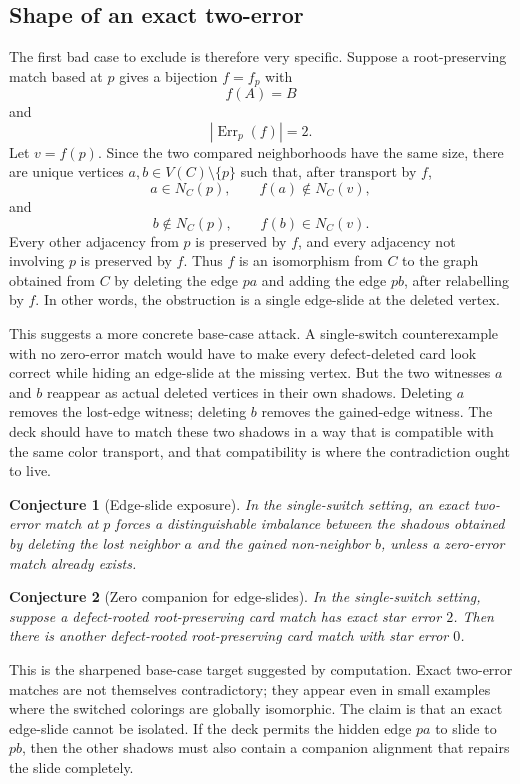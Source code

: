 \documentclass[11pt]{article}
\newtheorem{conjecture}{Conjecture}
\newcommand{\Err}{\operatorname{Err}}
\begin{document}
\subsection{Shape of an exact two-error}

The first bad case to exclude is therefore very specific.  Suppose a
root-preserving match based at \(p\) gives a bijection \(f=f_p\) with
\[
  f(A)=B
\]
and
\[
  |\Err_p(f)|=2.
\]
Let \(v=f(p)\).  Since the two compared neighborhoods have the same size,
there are unique vertices \(a,b\in V(C)\setminus\{p\}\) such that, after
transport by \(f\),
\[
  a\in N_C(p),
  \qquad
  f(a)\notin N_C(v),
\]
and
\[
  b\notin N_C(p),
  \qquad
  f(b)\in N_C(v).
\]
Every other adjacency from \(p\) is preserved by \(f\), and every adjacency
not involving \(p\) is preserved by \(f\).  Thus \(f\) is an isomorphism from
\(C\) to the graph obtained from \(C\) by deleting the edge \(pa\) and adding
the edge \(pb\), after relabelling by \(f\).  In other words, the obstruction
is a single edge-slide at the deleted vertex.

This suggests a more concrete base-case attack.  A single-switch
counterexample with no zero-error match would have to make every
defect-deleted card look correct while hiding an edge-slide at the missing
vertex.  But the two witnesses \(a\) and \(b\) reappear as actual deleted
vertices in their own shadows.  Deleting \(a\) removes the lost-edge witness;
deleting \(b\) removes the gained-edge witness.  The deck should have to
match these two shadows in a way that is compatible with the same color
transport, and that compatibility is where the contradiction ought to live.

\begin{conjecture}[Edge-slide exposure]
In the single-switch setting, an exact two-error match at \(p\) forces a
distinguishable imbalance between the shadows obtained by deleting the lost
neighbor \(a\) and the gained non-neighbor \(b\), unless a zero-error match
already exists.
\end{conjecture}

\begin{conjecture}[Zero companion for edge-slides]
In the single-switch setting, suppose a defect-rooted root-preserving card
match has exact star error \(2\).  Then there is another defect-rooted
root-preserving card match with star error \(0\).
\end{conjecture}

This is the sharpened base-case target suggested by computation.  Exact
two-error matches are not themselves contradictory; they appear even in small
examples where the switched colorings are globally isomorphic.  The claim is
that an exact edge-slide cannot be isolated.  If the deck permits the hidden
edge \(pa\) to slide to \(pb\), then the other shadows must also contain a
companion alignment that repairs the slide completely.
\end{document}
